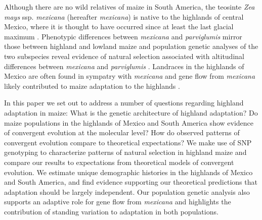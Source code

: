 Although there are no wild relatives of maize in South America, the teosinte \emph{Zea mays} ssp. \emph{mexicana} (hereafter \emph{mexicana}) is native to the highlands of central Mexico, where it is thought to have occurred since at least the last glacial maximum \cite[]{Ross-Ibarra_2009_19153259, Hufford_niche}. Phenotypic differences between \emph{mexicana} and \emph{parviglumis} mirror those between highland and lowland maize \cite[]{Lauter_2004_15342532} and population genetic analyses of the two subspecies reveal evidence of natural selection associated with altitudinal differences between \emph{mexicana} and \emph{parviglumis} \cite[]{Pyhajarvi2013}.  Landraces in the highlands of Mexico are often found in sympatry with  \emph{mexicana} and gene flow from \emph{mexicana} likely contributed to maize adaptation to the highlands \cite[]{Profford_2013}.

In this paper we set out to address a number of questions regarding highland adaptation in maize: 
What is the genetic architecture of highland adaptation? 
Do maize populations in the highlands of Mexico and South America show evidence of convergent evolution at the molecular level? 
How do observed patterns of convergent evolution compare to theoretical expectations?
We make use of SNP genotyping to characterize patterns of natural selection in highland maize and compare our results to expectations from theoretical models of convergent evolution.  
We estimate unique demographic histories in the highlands of Mexico and South America, and find evidence supporting our theoretical predictions that adaptation should be largely independent. 
Our population genetic analysis also supports an adaptive role for gene flow from \emph{mexicana} and highlights the contribution of standing variation to adaptation in both populations.
